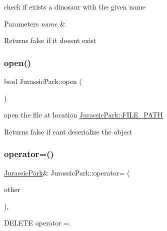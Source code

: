 check if exists a dinosaur with the given name 
\begin{DoxyParams}{Parameters}
{\em name} & \\
\hline
\end{DoxyParams}
\begin{DoxyReturn}{Returns}
false if it doesn\textquotesingle{}t exist 
\end{DoxyReturn}
\mbox{\label{classJurassicPark_a45c3966b859c4925e001592b121f02c5}} 
\subsubsection{\texorpdfstring{open()}{open()}}
{\footnotesize\ttfamily bool Jurassic\+Park\+::open (\begin{DoxyParamCaption}{ }\end{DoxyParamCaption})}

open the file at location \hyperlink{classJurassicPark_a0997428c12ee5be9fb69c87415cab85b}{Jurassic\+Park\+::\+F\+I\+L\+E\+\_\+\+P\+A\+TH} \begin{DoxyReturn}{Returns}
false if can\textquotesingle{}t deserialize the object 
\end{DoxyReturn}
\mbox{\label{classJurassicPark_ab229e57fe698d5916b6197fb05742b9d}} 
\subsubsection{\texorpdfstring{operator=()}{operator=()}}
{\footnotesize\ttfamily \hyperlink{classJurassicPark}{Jurassic\+Park}\& Jurassic\+Park\+::operator= (\begin{DoxyParamCaption}\item[{const \hyperlink{classJurassicPark}{Jurassic\+Park} \&}]{other }\end{DoxyParamCaption})\hspace{0.3cm}{\ttfamily [private]}, {\ttfamily [delete]}}



D\+E\+L\+E\+TE operator =. 

\mbox{\label{classJurassicPark_aac9409ebb9d2a782ffe0c74eac887b42}} 
